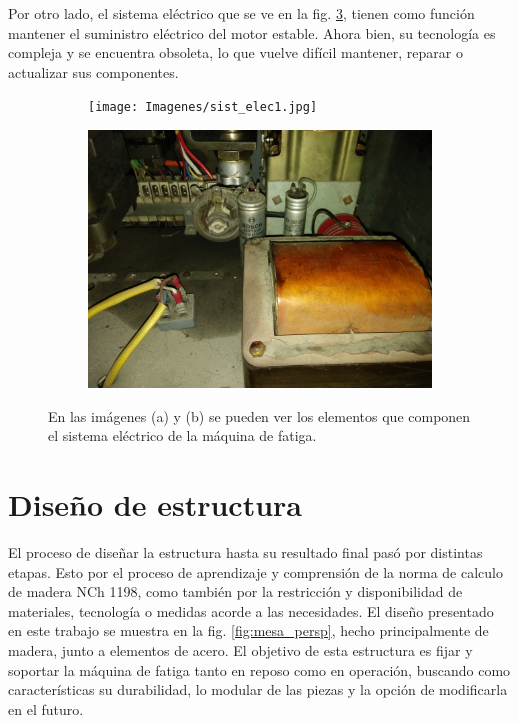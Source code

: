 Por otro lado, el sistema eléctrico que se ve en la fig. \ref{fig:sist_elec}, tienen como función mantener el suministro eléctrico del motor estable. Ahora bien, su tecnología es compleja y se encuentra obsoleta, lo que vuelve difícil mantener, reparar o actualizar sus componentes.

\begin{figure}[h]
\centering
	\begin{subfigure}{0.5\linewidth}
		\centering
		\texttt{[image: Imagenes/sist\_elec1.jpg]}
		\caption{}\label{fig:sist_elect1}
	\end{subfigure}%
	\begin{subfigure}{0.5\linewidth}
		\centering
		\includegraphics[width=0.98\linewidth]{Imagenes/sist_elec2.jpg}
		\caption{}\label{fig:sist_elect2}
	\end{subfigure}%
\caption{En las imágenes (a) y (b) se pueden ver los elementos que componen el sistema eléctrico de la máquina de fatiga.}
\label{fig:sist_elec}
\end{figure}
 
\section{Diseño de estructura}
El proceso de diseñar la estructura hasta su resultado final pasó por distintas etapas. Esto por el proceso de aprendizaje y comprensión de la norma de calculo de madera NCh 1198, como también por la restricción y disponibilidad de materiales, tecnología o medidas acorde a las necesidades. El diseño presentado en este trabajo se muestra en la fig. \ref{fig:mesa_persp}, hecho principalmente de madera, junto a elementos de acero. El objetivo de esta estructura es fijar y soportar la máquina de fatiga tanto en reposo como en operación, buscando como características su durabilidad, lo modular de las piezas y la opción de modificarla en el futuro.

